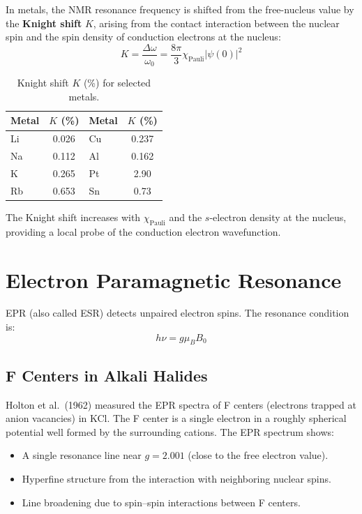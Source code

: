 In metals, the NMR resonance frequency is shifted from the free-nucleus value by the \textbf{Knight shift} $K$, arising from the contact interaction between the nuclear spin and the spin density of conduction electrons at the nucleus:
\begin{equation}
  K = \frac{\Delta\omega}{\omega_0} = \frac{8\pi}{3}\chi_{\text{Pauli}} |\psi(0)|^2
\end{equation}

\begin{table}[H]
\centering
\caption{Knight shift $K$ (\%) for selected metals.}
\label{tab:knight}
\begin{tabular}{@{}lSlS@{}}
\toprule
Metal & {$K$ (\%)} & Metal & {$K$ (\%)} \\
\midrule
Li & 0.026 & Cu & 0.237 \\
Na & 0.112 & Al & 0.162 \\
K  & 0.265 & Pt & 2.90 \\
Rb & 0.653 & Sn & 0.73 \\
\bottomrule
\end{tabular}
\end{table}

The Knight shift increases with $\chi_{\text{Pauli}}$ and the $s$-electron density at the nucleus, providing a local probe of the conduction electron wavefunction.

\section{Electron Paramagnetic Resonance}

EPR (also called ESR) detects unpaired electron spins. The resonance condition is:
\begin{equation}
  h\nu = g\mu_B B_0
\end{equation}

\subsection{F Centers in Alkali Halides}

Holton et al.\ (1962) measured the EPR spectra of F centers (electrons trapped at anion vacancies) in KCl. The F center is a single electron in a roughly spherical potential well formed by the surrounding cations. The EPR spectrum shows:
\begin{itemize}[nosep]
  \item A single resonance line near $g = 2.001$ (close to the free electron value).
  \item Hyperfine structure from the interaction with neighboring nuclear spins.
  \item Line broadening due to spin--spin interactions between F centers.
\end{itemize}

